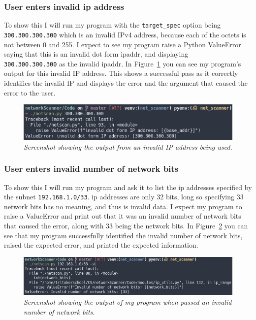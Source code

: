 \documentclass[titlepage]{article}
\let\Oldsubsubsection\subsubsection{}
\renewcommand{\subsubsection}{\FloatBarrier\Oldsubsubsection}
\begin{document}
\subsubsection{User enters invalid ip address}
To show this I will run my program with the \verb|target_spec|
option being \\
\verb|300.300.300.300| which is an invalid
IPv4 address, because each of the octets is not between 0 and 255.
I expect to see my program raise a Python ValueError
saying that this is an invalid dot form \gls{ipaddr},
and displaying \\
\verb|300.300.300.300| as the invalid \gls{ipaddr}.
In Figure~\ref{invalidip} you can see my program's output
for this invalid IP address. This shows a successful pass as it
correctly identifies the invalid IP and displays the error
and the argument that caused the error to the user.

\begin{figure}[H]
  \centering
  \includegraphics[width=\textwidth]{invalidip.png}
  \caption{\textit{%
    Screenshot showing the output from an invalid IP address being used.
}}\label{invalidip}
\end{figure}

\subsubsection{User enters invalid number of network bits}
To show this I will run my program and ask it to list the
\gls{ip} addresses specified by the subnet \verb|192.168.1.0/33|.
\gls{ip} addresses are only 32 bits, long so specifying 33
network bits has no meaning, and thus is invalid data.
I expect my program to raise a ValueError and print out
that it was an invalid number of network bits that caused
the error, along with 33 being the network bits.
In Figure~\ref{invalidnetworkbits} you can see that
my program successfully identified the invalid number of network bits,
raised the expected error, and printed the expected information.

\begin{figure}[H]
\centering
\includegraphics[width=\textwidth]{invalidnetworkbits.png}
\caption{\textit{%
  Screenshot showing the output of my program when passed
  an invalid number of network bits.
}}\label{invalidnetworkbits}
\end{figure}
\end{document}
